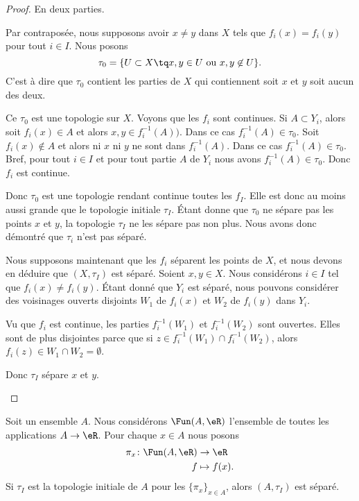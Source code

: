 \begin{proof}
	En deux parties.
	\begin{subproof}
		\spitem[\( \Rightarrow\)]
		Par contraposée, nous supposons avoir \( x\neq y\) dans \( X\) tels que \( f_i(x)=f_i(y)\) pour tout \( i\in I\). Nous posons
		\begin{equation}
			\tau_0=\{ U\subset X\tq x,y\in U\text{ ou }x,y\not\in U \}.
		\end{equation}
		C'est à dire que \( \tau_0\) contient les parties de \( X\) qui contiennent soit \( x\) et \( y\) soit aucun des deux.

		Ce \( \tau_0\) est une topologie sur \( X\). Voyons que les \( f_i\) sont continues. Si \( A\subset Y_i\), alors soit \( f_i(x)\in A\) et alors \( x,y\in f_i^{-1}(A))\). Dans ce cas \( f_i^{-1}(A)\in \tau_0\). Soit \( f_i(x)\not\in A\) et alors ni \( x\) ni \( y\) ne sont dans \( f_i^{-1}(A)\). Dans ce cas \( f_i^{-1}(A)\in \tau_0\). Bref, pour tout \( i\in I\) et pour tout partie \( A\) de \( Y_i\) nous avons \( f_i^{-1}(A)\in \tau_0\). Donc \( f_i\) est continue.

		Donc \( \tau_0\) est une topologie rendant continue toutes les \( f_I\). Elle est donc au moins aussi grande que le topologie initiale \( \tau_I\). Étant donne que \( \tau_0\) ne sépare pas les points \( x\) et \( y\), la topologie \( \tau_I\) ne les sépare pas non plus. Nous avons donc démontré que \( \tau_i\) n'est pas séparé.

		\spitem[\( \Leftarrow\)]
		Nous supposons maintenant que les \( f_i\) séparent les points de \( X\), et nous devons en déduire que \( (X,\tau_I)\) est séparé. Soient \( x,y\in X\). Nous considérons \( i\in I\) tel que \( f_i(x)\neq f_i(y)\). Étant donné que \( Y_i\) est séparé, nous pouvons considérer des voisinages ouverts disjoints \( W_1\) de \( f_i(x)\) et \( W_2\) de \( f_i(y)\) dans \( Y_i\).

		Vu que \( f_i\) est continue, les parties \( f_i^{-1}(W_1)\) et \( f_i^{-1}(W_2)\) sont ouvertes. Elles sont de plus disjointes parce que si \( z\in f_i^{-1}(W_1)\cap f_i^{-1}(W_2)\), alors \( f_i(z)\in W_1\cap W_2=\emptyset\).

		Donc \( \tau_I\) sépare \( x\) et \( y\).
	\end{subproof}
\end{proof}

\begin{lemma}	\label{LEMooZLZKooHElBOs}
	Soit un ensemble \( A\). Nous considérons \( \Fun(A,\eR)\) l'ensemble de toutes les applications \( A\to \eR\). Pour chaque \( x\in A\) nous posons
	\begin{equation}
		\begin{aligned}
			\pi_x\colon \Fun(A,\eR) & \to \eR       \\
			f                       & \mapsto f(x).
		\end{aligned}
	\end{equation}
	Si \( \tau_I\) est la topologie initiale de \( A\) pour les \( \{ \pi_x \}_{x\in A}\), alors \( (A,\tau_I)\) est séparé.
\end{lemma}

